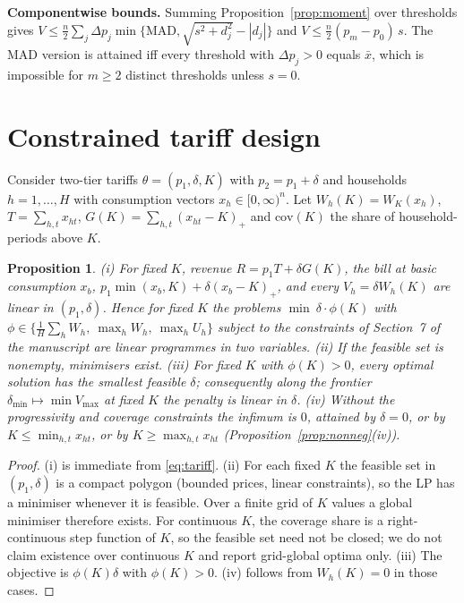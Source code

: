 \documentclass[11pt,a4paper]{article}
\theoremstyle{definition}
\theoremstyle{plain}\newtheorem{sprop}{Proposition}[section]\newtheorem{slemma}[sprop]{Lemma}\newtheorem{scor}[sprop]{Corollary}
\theoremstyle{definition}
\theoremstyle{remark}
\newcommand{\xbar}{\bar{x}}
\newcommand{\pos}[1]{\left(#1\right)_{+}}
\numberwithin{equation}{section}
\begin{document}
\noindent\textbf{Componentwise bounds.} Summing Proposition~\ref{prop:moment} over thresholds gives $V\le\frac n2\sum_j\Delta p_j\min\{\mathrm{MAD},\sqrt{s^2+d_j^2}-|d_j|\}$ and $V\le\frac n2(p_m-p_0)\,s$. The MAD version is attained iff every threshold with $\Delta p_j>0$ equals $\xbar$, which is impossible for $m\ge2$ distinct thresholds unless $s=0$.

\section{Constrained tariff design}\label{sec:S9}

Consider two-tier tariffs $\theta=(p_1,\delta,K)$ with $p_2=p_1+\delta$ and households $h=1,\dots,H$ with consumption vectors $x_h\in[0,\infty)^n$. Let $W_h(K)=W_K(x_h)$, $T=\sum_{h,t}x_{ht}$, $G(K)=\sum_{h,t}\pos{x_{ht}-K}$ and $\mathrm{cov}(K)$ the share of household-periods above $K$.

\begin{sprop}\label{prop:lp}
(i) For fixed $K$, revenue $R=p_1T+\delta G(K)$, the bill at basic consumption $x_b$, $p_1\min(x_b,K)+\delta\pos{x_b-K}$, and every $V_h=\delta W_h(K)$ are linear in $(p_1,\delta)$. Hence for fixed $K$ the problems $\min\ \delta\cdot\phi(K)$ with $\phi\in\{\frac1H\sum_hW_h,\ \max_hW_h,\ \max_hU_h\}$ subject to the constraints of Section~7 of the manuscript are linear programmes in two variables.
(ii) If the feasible set is nonempty, minimisers exist.
(iii) For fixed $K$ with $\phi(K)>0$, every optimal solution has the smallest feasible $\delta$; consequently along the frontier $\delta_{\min}\mapsto\min V_{\max}$ at fixed $K$ the penalty is linear in $\delta$.
(iv) Without the progressivity and coverage constraints the infimum is $0$, attained by $\delta=0$, or by $K\le\min_{h,t}x_{ht}$, or by $K\ge\max_{h,t}x_{ht}$ (Proposition~\ref{prop:nonneg}(iv)).
\end{sprop}
\begin{proof}
(i) is immediate from \eqref{eq:tariff}. (ii) For each fixed $K$ the feasible set in $(p_1,\delta)$ is a compact polygon (bounded prices, linear constraints), so the LP has a minimiser whenever it is feasible. Over a finite grid of $K$ values a global minimiser therefore exists. For continuous $K$, the coverage share is a right-continuous step function of $K$, so the feasible set need not be closed; we do not claim existence over continuous $K$ and report grid-global optima only. (iii) The objective is $\phi(K)\delta$ with $\phi(K)>0$. (iv) follows from $W_h(K)=0$ in those cases.
\end{proof}
\end{document}
